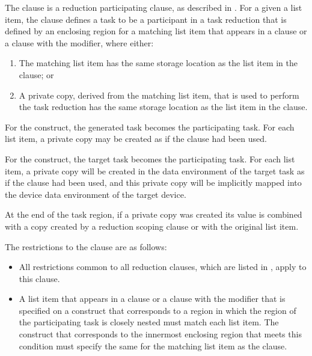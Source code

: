 \descr
The  clause is a reduction participating clause, as
described in . For a
given a list item, the  clause defines a task to be a
participant in a task reduction that is defined by an enclosing region for a
matching list item that appears in a  clause or a
 clause with the  modifier, where either:

\begin{enumerate}
\item The matching list item has the same storage location as the list
      item in the  clause; or
\item A private copy, derived from the matching list item, that is used to
      perform the task reduction has the same storage location as the list item
      in the  clause.
\end{enumerate}

For the  construct, the generated task becomes the participating
task. For each list item, a private copy may be created as if the 
clause had been used.

For the  construct, the target task becomes the participating
task. For each list item, a private copy will be created in the data
environment of the target task as if the  clause had been used,
and this private copy will be implicitly mapped into the device data
environment of the target device.

At the end of the task region, if a private copy was created its value is
combined with a copy created by a reduction scoping clause or with the original
list item.

\restrictions
The restrictions to the  clause are as follows:

\begin{itemize}
\item All restrictions common to all reduction clauses, which are listed in
      , apply to
      this clause.
\item A list item that appears in a  clause or a 
       clause with the  modifier that is specified on 
      a construct that corresponds to a region in which the region of the 
      participating task is closely nested must match each list item. The 
      construct that corresponds to the innermost enclosing region that meets
      this condition must specify the same  for the
      matching list item as the  clause.
\end{itemize}



